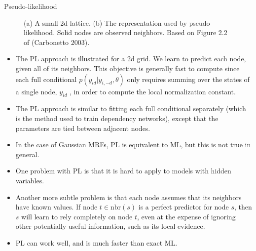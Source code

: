 \documentclass[10pt,mathserif]{beamer}
\begin{document}
\begin{frame}{Pseudo-likelihood}
\begin{figure}[h]
\centering     %
{}
\caption{(a) A small 2d lattice. (b) The representation used by pseudo likelihood. Solid nodes are observed neighbors. Based on Figure 2.2 of (Carbonetto 2003).}
\end{figure}

\begin{itemize}
    \item The PL approach is illustrated for a 2d grid. We learn to predict each node, given all of its neighbors. This objective is generally fast to compute since each full conditional $p(y_{id}|y_{i,-d},\theta)$ only requires summing over the states of a single node, $y_{id}$ , in order to compute the local normalization constant.
    \item The PL approach is similar to fitting each full conditional separately (which is the method used to train dependency networks), except that the parameters are tied between adjacent nodes.
    \item In the case of Gaussian MRFs, PL is equivalent to ML, but this is not true in general.
    \item One problem with PL is that it is hard to apply to models with hidden variables.
    \item Another more subtle problem is that each node assumes that its neighbors have known values. If node $t \in \text{nbr}(s)$ is a perfect predictor for node $s$, then $s$ will learn to rely completely on node $t$, even at the expense of ignoring other potentially useful information, such as its local evidence.
    \item PL can work well, and is much faster than exact ML.
\end{itemize}
\end{frame}
\end{document}
